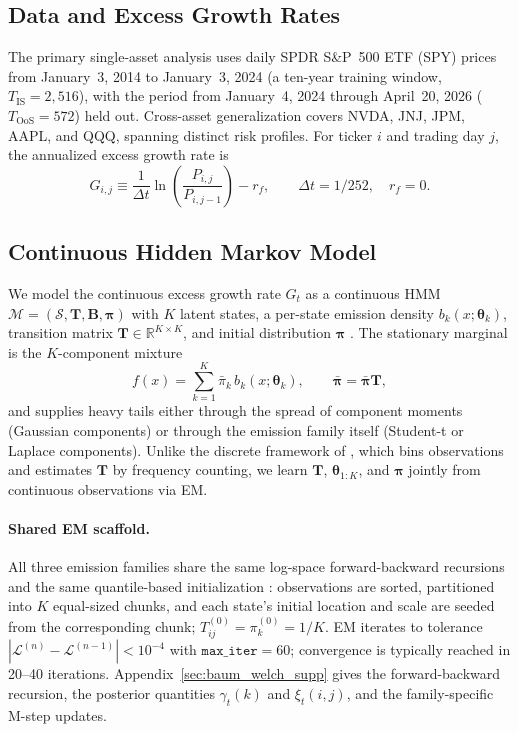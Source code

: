 \subsection{Data and Excess Growth Rates}
\label{sec:data}

The primary single-asset analysis uses daily SPDR S\&P~500 ETF (SPY) prices from January~3, 2014 to January~3, 2024 (a ten-year training window, $T_{\text{IS}} = 2{,}516$), with the period from January~4, 2024 through April~20, 2026 ($T_{\text{OoS}} = 572$) held out.
Cross-asset generalization covers NVDA, JNJ, JPM, AAPL, and QQQ, spanning distinct risk profiles.
For ticker $i$ and trading day $j$, the annualized excess growth rate is
\begin{equation}
    G_{i,j} \equiv \frac{1}{\Delta t} \ln\!\left(\frac{P_{i,j}}{P_{i,j-1}}\right) - r_f,
    \qquad \Delta t = 1/252, \quad r_f = 0.
    \label{eq:growth_rate}
\end{equation}

\subsection{Continuous Hidden Markov Model}
\label{sec:chmm_def}

We model the continuous excess growth rate $G_t$ as a continuous HMM
$\mathcal{M} = (\mathcal{S}, \mathbf{T}, \mathbf{B}, \boldsymbol{\pi})$
with $K$ latent states, a per-state emission density $b_k(x; \boldsymbol\theta_k)$,
transition matrix $\mathbf{T} \in \mathbb{R}^{K \times K}$, and initial
distribution $\boldsymbol{\pi}$ \cite{rabiner1986introduction}.
The stationary marginal is the $K$-component mixture
\begin{equation}
    f(x) = \sum_{k=1}^{K} \bar{\pi}_k\, b_k(x; \boldsymbol\theta_k),
    \qquad \bar{\boldsymbol{\pi}} = \bar{\boldsymbol{\pi}} \mathbf{T},
    \label{eq:mixture}
\end{equation}
and supplies heavy tails either through the spread of component moments
(Gaussian components) or through the emission family itself (Student-t or
Laplace components).
Unlike the discrete framework of \citet{alswaidan2026hybrid}, which bins
observations and estimates $\mathbf{T}$ by frequency counting, we learn
$\mathbf{T}$, $\boldsymbol\theta_{1:K}$, and $\boldsymbol{\pi}$ jointly
from continuous observations via EM.

\paragraph{Shared EM scaffold.}
All three emission families share the same log-space forward-backward
recursions and the same quantile-based initialization \cite{bilmes1998gentle}:
observations are sorted, partitioned into $K$ equal-sized chunks, and each
state's initial location and scale are seeded from the corresponding chunk;
$T_{ij}^{(0)} = \pi_k^{(0)} = 1/K$.
EM iterates to tolerance $|\mathcal{L}^{(n)} - \mathcal{L}^{(n-1)}| < 10^{-4}$
with $\texttt{max\_iter} = 60$; convergence is typically reached in
20--40 iterations.
Appendix~\ref{sec:baum_welch_supp} gives the forward-backward recursion,
the posterior quantities $\gamma_t(k)$ and $\xi_t(i, j)$, and the
family-specific M-step updates.

